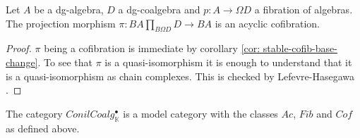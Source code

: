 \documentclass[../thesis.tex]{subfiles}
\begin{document}
            \begin{lemma}\label{lem: tech-fac}
                Let $A$ be a dg-algebra, $D$ a dg-coalgebra and $p: A \rightarrow \Omega D$ a fibration of algebras. The projection morphism $\pi : BA\prod_{B\Omega D}D \rightarrow BA$ is an acyclic cofibration.
                \begin{center}
                \end{center}
            \end{lemma}

            \begin{proof}
                $\pi$ being a cofibration is immediate by corollary \ref{cor: stable-cofib-base-change}. To see that $\pi$ is a quasi-isomorphism it is enough to understand that it is a quasi-isomorphism as chain complexes. This is checked by Lefevre-Hasegawa \cite{LefevreHasegawa03}.
            \end{proof}

            \begin{thm}
                The category $ConilCoalg^\bullet_{\mathbb{K}}$ is a model category with the classes $Ac$, $Fib$ and $Cof$ as defined above.
            \end{thm}
\end{document}
